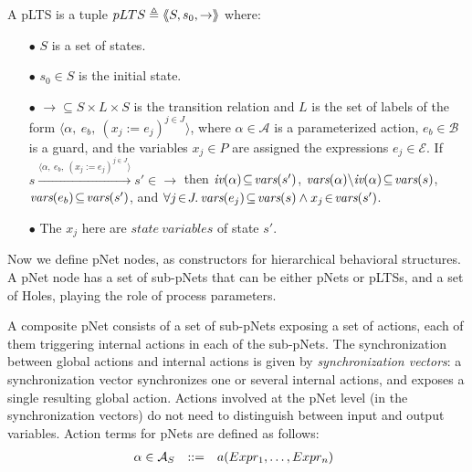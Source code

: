 \documentclass{lncs/llncs}
\def\AlgE{\mathcal{E}}
\def\AlgA{\mathcal{A}}
\def\AlgAS{\mathcal{A}_S}
\def\AlgB{\mathcal{B}}
\begin{document}
\begin{definition}[pLTS]
\label{pLTS}
A pLTS is a tuple
$pLTS\triangleq\langle\hspace{-0.58ex}\langle S,s_0, \to\rangle\hspace{-0.58ex}\rangle$ where:
\begin{itemize}
\item[$\bullet$]
$S$ is a set of states.
\item[$\bullet$]
$s_0 \in S$ is the initial state.
\item[$\bullet$] $\to \subseteq S \times L \times S$ is the transition relation and 
$L$ is the set of labels of the form
$\langle \alpha,~e_b,~(x_j\!:= {e}_j)^{j\in J}\rangle$,
where $\alpha \in\AlgA$ is a parameterized action, $e_b \in
\AlgB$ is a guard, and the variables $x_j\in P$
are assigned the expressions $e_j\in \AlgE$.
If 
$s \xrightarrow{\langle \alpha,~e_b,~(x_j\!:= {e}_j)^{j\in
		J}\rangle} s'\in \to $ then $\iv(\alpha)\!\subseteq\! \vars(s')$, 
		$\vars(\alpha)\backslash \iv(\alpha)\!\subseteq\! \vars(s)$, 
		$\vars(e_b)\!\subseteq\! \vars(s')$, and
		$\forall j\!\in\! J .\,\vars(e_j)\!\subseteq\! \vars(s)\land 
		x_j\!\in\!\vars(s')$. %
\item[$\bullet$]
The $x_j$ here are $state\ variables$ of state $s'$. 


\end{itemize}
\end{definition}

Now we define
pNet nodes, as constructors for hierarchical behavioral structures.
A pNet node has a set of sub-pNets that can be either pNets or pLTSs, and a
set of Holes, playing the role of process parameters.

A composite pNet consists of a set of sub-pNets exposing
a set of actions, each of them triggering internal actions in each of
the sub-pNets. The synchronization between global actions and
internal actions is given by  \emph{synchronization vectors}: a
synchronization vector synchronizes one or several internal actions, and
exposes a single resulting global action.
Actions involved at the pNet level (in the synchronization vectors) do
not need to distinguish between input and output
variables. Action terms for pNets are defined as follows:
\[\begin{array}[l]{rcl@{\quad}l}
  \alpha\in \AlgAS &::=&a(Expr_1,\ldots,Expr_n)
\end{array}
\]
\end{document}
